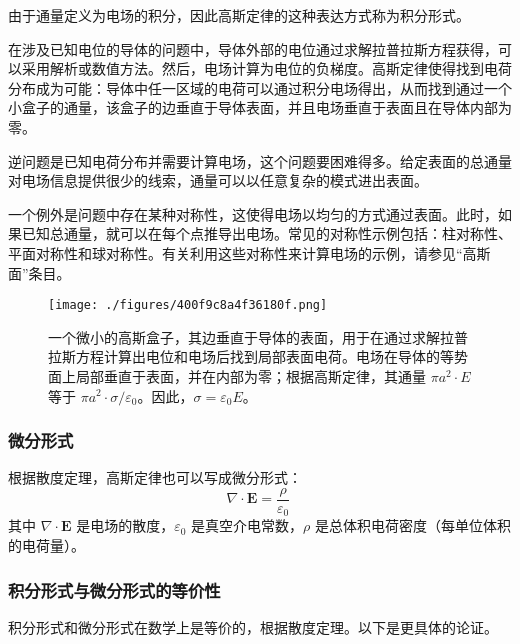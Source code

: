 由于通量定义为电场的积分，因此高斯定律的这种表达方式称为积分形式。

在涉及已知电位的导体的问题中，导体外部的电位通过求解拉普拉斯方程获得，可以采用解析或数值方法。然后，电场计算为电位的负梯度。高斯定律使得找到电荷分布成为可能：导体中任一区域的电荷可以通过积分电场得出，从而找到通过一个小盒子的通量，该盒子的边垂直于导体表面，并且电场垂直于表面且在导体内部为零。

逆问题是已知电荷分布并需要计算电场，这个问题要困难得多。给定表面的总通量对电场信息提供很少的线索，通量可以以任意复杂的模式进出表面。

一个例外是问题中存在某种对称性，这使得电场以均匀的方式通过表面。此时，如果已知总通量，就可以在每个点推导出电场。常见的对称性示例包括：柱对称性、平面对称性和球对称性。有关利用这些对称性来计算电场的示例，请参见“高斯面”条目。
\begin{figure}[ht]
\centering
\texttt{[image: ./figures/400f9c8a4f36180f.png]}
\caption{一个微小的高斯盒子，其边垂直于导体的表面，用于在通过求解拉普拉斯方程计算出电位和电场后找到局部表面电荷。电场在导体的等势面上局部垂直于表面，并在内部为零；根据高斯定律，其通量 \( \pi a^2 \cdot E \) 等于 \( \pi a^2 \cdot \sigma / \varepsilon_0 \)。因此，\(\sigma = \varepsilon_0 E\)。} \label{fig_GSDL_4}
\end{figure}
\subsubsection{微分形式}
根据散度定理，高斯定律也可以写成微分形式：
\[
\nabla \cdot \mathbf{E} = \frac{\rho}{\varepsilon_0}~
\]
其中 \(\nabla \cdot \mathbf{E}\) 是电场的散度，\(\varepsilon_0\) 是真空介电常数，\(\rho\) 是总体积电荷密度（每单位体积的电荷量）。
\subsubsection{积分形式与微分形式的等价性}
积分形式和微分形式在数学上是等价的，根据散度定理。以下是更具体的论证。